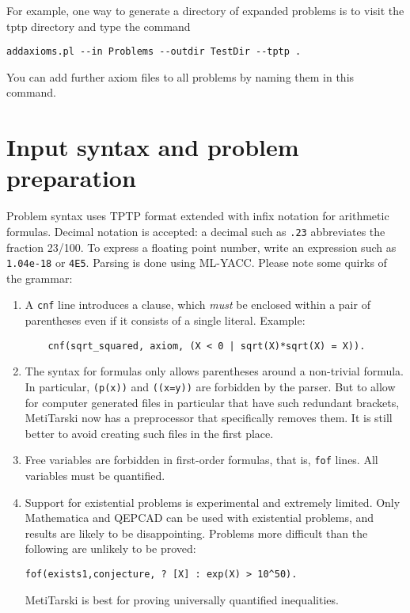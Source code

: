 \documentclass[a4paper,11pt]{scrartcl}
\begin{document}
For example, one way to generate a directory of expanded problems is to visit
the tptp directory and type the command
\begin{verbatim}
addaxioms.pl --in Problems --outdir TestDir --tptp .
\end{verbatim}
%
You can add further axiom files to all problems by naming them in this command.

\section{Input syntax and problem preparation}

Problem syntax uses TPTP format extended with infix notation for arithmetic formulas.
Decimal notation is accepted: a decimal such as \texttt{.23} abbreviates the fraction 23/100.
To express a floating point number, write an expression such as \texttt{1.04e-18} or \texttt{4E5}.
Parsing is done using ML-YACC. Please note some quirks of the grammar:

\begin{enumerate}
\item A \texttt{cnf} line introduces a clause, which \textit{must} be enclosed within a pair of parentheses
   even if it consists of a single literal. Example:
\begin{verbatim}
	cnf(sqrt_squared, axiom, (X < 0 | sqrt(X)*sqrt(X) = X)).
\end{verbatim}

\item The syntax for formulas only allows parentheses around a non-trivial formula.
    In particular, \texttt{(p(x))} and \texttt{((x=y))} are forbidden by the parser. But to allow for computer generated
    files in particular that have such redundant brackets, MetiTarski now has a preprocessor that
    specifically removes them. It is still better to avoid creating such files in the first place.

\item Free variables are forbidden in first-order formulas, that is, \texttt{fof} lines. All variables must be quantified.

\item Support for existential problems is experimental and extremely limited. Only Mathematica and QEPCAD can be used with existential problems, and results are likely to be disappointing.  Problems more difficult than the following are unlikely to be proved:
\begin{verbatim}
fof(exists1,conjecture, ? [X] : exp(X) > 10^50).
\end{verbatim}
MetiTarski is best for proving universally quantified inequalities.
\end{enumerate}
\end{document}
